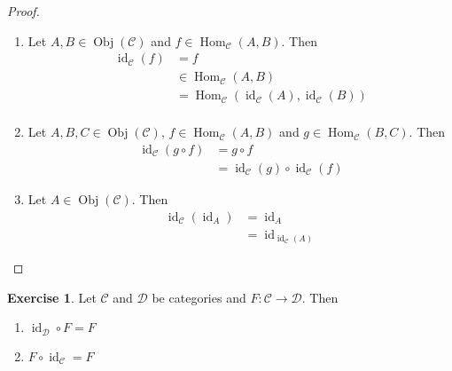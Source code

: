 \documentclass[12pt]{amsart}
\theoremstyle{definition}
\newtheorem{ex}[definition]{Exercise}
\newcommand{\MC}{\mathcal{C}}
\newcommand{\MD}{\mathcal{D}}
\DeclareMathOperator{\id}{id}
\DeclareMathOperator{\Obj}{Obj}
\DeclareMathOperator{\Hom}{Hom}
\DeclareMathOperator*{\0}{\mbf{0}}
\DeclareMathOperator*{\1}{\mbf{1}}
\newcommand{\lex}[1]{\label{ex:#1}}
\begin{document}
	\begin{proof}\
		\begin{enumerate}
			\item Let $A, B \in \Obj(\MC)$ and $f \in \Hom_{\MC}(A,B)$. Then 
			\begin{align*}
				\id_{\MC}(f) 
				& = f \\
				& \in \Hom_{\MC}(A, B) \\
				& = \Hom_{\MC}(\id_{\MC}(A), \id_{\MC}(B)) \\
			\end{align*}
			\item Let $A,B, C \in \Obj(\MC)$, $f \in \Hom_{\MC}(A,B)$ and $g \in \Hom_{\MC}(B, C)$. Then 
			\begin{align*}
				\id_{\MC}(g \circ f) 
				& = g \circ f \\
				& = \id_{\MC}(g) \circ \id_{\MC} (f)
			\end{align*}
			\item Let $A \in \Obj(\MC)$. Then 
			\begin{align*}
				\id_{\MC}(\id_{A})
				& = \id_A \\
				& = \id_{\id_{\MC}(A)}
			\end{align*}
		\end{enumerate}
	\end{proof}

	\begin{ex} \lex{13006}
		Let $\MC$ and $\MD$ be categories and $F:\MC \rightarrow \MD$. Then 
		\begin{enumerate}
			\item $\id_{\MD} \circ F = F$
			\item $F \circ \id_{\MC} = F$
		\end{enumerate}
	\end{ex}
\end{document}
